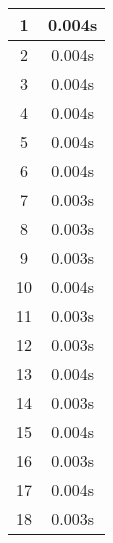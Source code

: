 \documentclass[11pt]{article}
\begin{document}
\begin{table}[!h]
\begin{center}
\begin{minipage}{0.48\textwidth}
\begin{tabular}{| c | c |}
				1 & 0.004s \\ \hline
				2 & 0.004s \\ \hline
				3 & 0.004s \\ \hline
				4 & 0.004s \\ \hline
				5 & 0.004s \\ \hline
				6 & 0.004s \\ \hline
				7 & 0.003s \\ \hline
				8 & 0.003s \\ \hline
				9 & 0.003s \\ \hline
				10 & 0.004s \\ \hline
				11 & 0.003s \\ \hline
				12 & 0.003s \\ \hline
				13 & 0.004s \\ \hline
				14 & 0.003s \\ \hline
				15 & 0.004s \\ \hline
				16 & 0.003s \\ \hline
				17 & 0.004s \\ \hline
				18 & 0.003s \\ \hline
			\end{tabular}
		\end{minipage}
	\end{center}
\end{table}


%
%
\pagebreak
%
%
\end{document}
